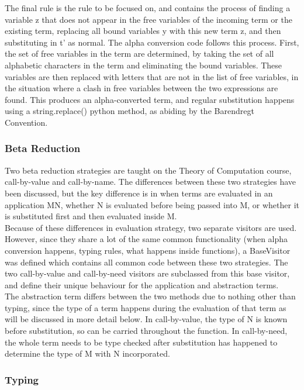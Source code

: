 \documentclass[a4paper,12pt]{report}
\begin{document}
The final rule is the rule to be focused on, and contains the process of finding a variable z that does not appear in the free variables of the incoming term or the existing term, replacing all bound variables y with this new term z, and then substituting in t’ as normal.
The alpha conversion code follows this process. First, the set of free variables in the term are determined, by taking the set of all alphabetic characters in the term and eliminating the bound variables. These variables are then replaced with letters that are not in the list of free variables, in the situation where a clash in free variables between the two expressions are found. This produces an alpha-converted term, and regular substitution happens using a string.replace() python method, as abiding by the Barendregt Convention.

\subsubsection{Beta Reduction}

Two beta reduction strategies are taught on the Theory of Computation course, call-by-value and call-by-name. The differences between these two strategies have been discussed, but the key difference is in when terms are evaluated in an application MN, whether N is evaluated before being passed into M, or whether it is substituted first and then evaluated inside M.\\

Because of these differences in evaluation strategy, two separate visitors are used. However, since they share a lot of the same common functionality (when alpha conversion happens, typing rules, what happens inside functions), a BaseVisitor was defined which contains all common code between these two strategies. The two call-by-value and call-by-need visitors are subclassed from this base visitor, and define their unique behaviour for the application and abstraction terms.\\

The abstraction term differs between the two methods due to nothing other than typing, since the type of a term happens during the evaluation of that term as will be discussed in more detail below. In call-by-value, the type of N is known before substitution, so can be carried throughout the function. In call-by-need, the whole term needs to be type checked after substitution has happened to determine the type of M with N incorporated.

\subsubsection{Typing}
\end{document}
